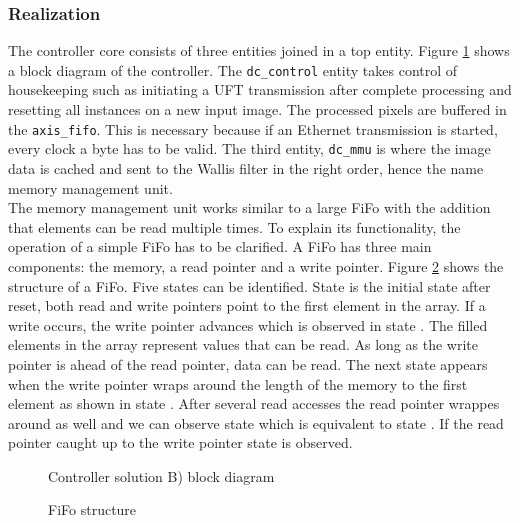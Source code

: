 \clearpage
\subsubsection*{Realization}
The controller core consists of three entities joined in a top entity. Figure 
\ref{fig:dctop} shows a block diagram of the controller. The 
\texttt{dc\_control} entity takes control of housekeeping such as initiating a
UFT transmission after complete processing and resetting all instances on a new
input image. The processed pixels are buffered in the \texttt{axis\_fifo}. This
is necessary because if an Ethernet transmission is started, every clock a byte
has to be valid. The third entity, \texttt{dc\_mmu} is where the image data is
cached and sent to the Wallis filter in the right order, hence the name memory
management unit.
\\

The memory management unit works similar to a large FiFo with the addition that
elements can be read multiple times. To explain its functionality, the operation
of a simple FiFo has to be clarified. A FiFo has three main components: the
memory, a read pointer and a write pointer. Figure \ref{fig:fifo} shows the
structure of a FiFo. Five states can be identified. State  is the initial
state after reset, both read and write pointers point to the first element in
the array. If a write occurs, the write pointer advances which is observed in
state . The filled elements in the array represent values that can be
read. As long as the write pointer is ahead of the read pointer, data can be
read. The next state appears when the write pointer wraps around the length of
the memory to the first element as shown in state . After several read
accesses the read pointer wrappes around as well and we can observe state 
 which is equivalent to state . If the read pointer caught up to
the write pointer state  is observed.

\begin{figure}[t!]
    \centering
    \begin{adjustbox}{max width=1\textwidth}
        
    \end{adjustbox}
    \caption{Controller solution B) block diagram}
    \label{fig:dctop}
\end{figure}

\clearpage

\begin{figure}[tb!]
    \centering
    \begin{adjustbox}{max width=\textwidth}
        
    \end{adjustbox}
    \caption{FiFo structure}
    \label{fig:fifo}
\end{figure}

